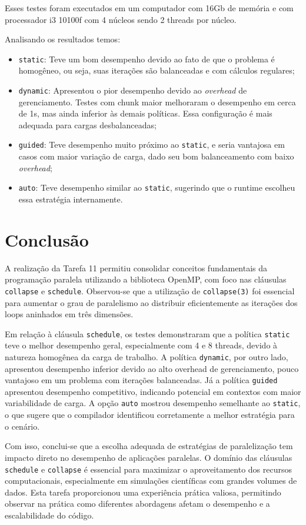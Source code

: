 \documentclass[a4paper, 12pt]{article}
\begin{document}
	Esses testes foram executados em um computador com 16Gb de memória e com processador i3 10100f com 4 núcleos sendo 2 threads por núcleo. 
	
	Analisando os resultados temos:
	
	\begin{itemize}  
		\item \texttt{static}: Teve um bom desempenho devido ao fato de que o problema é homogêneo, ou seja, suas iterações são balanceadas e com cálculos regulares;
		\item \texttt{dynamic}: Apresentou o pior desempenho devido ao \textit{overhead} de gerenciamento. Testes com chunk maior melhoraram o desempenho em cerca de 1s, mas ainda inferior às demais políticas. Essa configuração é mais adequada para cargas desbalanceadas;
		\item \texttt{guided}: Teve desempenho muito próximo ao \texttt{static}, e seria vantajosa em casos com maior variação de carga, dado seu bom balanceamento com baixo \textit{overhead};
		\item \texttt{auto}: Teve desempenho similar ao \texttt{static}, sugerindo que o runtime escolheu essa estratégia internamente.
	\end{itemize}  
	
	\section{Conclusão}  
	\hspace{.62cm}A realização da Tarefa 11 permitiu consolidar conceitos fundamentais da programação paralela utilizando a biblioteca OpenMP, com foco nas cláusulas \texttt{collapse} e \texttt{schedule}. Observou-se que a utilização de \texttt{collapse(3)} foi essencial para aumentar o grau de paralelismo ao distribuir eficientemente as iterações dos loops aninhados em três dimensões.  
	
	Em relação à cláusula \texttt{schedule}, os testes demonstraram que a política \texttt{static} teve o melhor desempenho geral, especialmente com 4 e 8 threads, devido à natureza homogênea da carga de trabalho. A política \texttt{dynamic}, por outro lado, apresentou desempenho inferior devido ao alto overhead de gerenciamento, pouco vantajoso em um problema com iterações balanceadas. Já a política \texttt{guided} apresentou desempenho competitivo, indicando potencial em contextos com maior variabilidade de carga. A opção \texttt{auto} mostrou desempenho semelhante ao \texttt{static}, o que sugere que o compilador identificou corretamente a melhor estratégia para o cenário.
	
	Com isso, conclui-se que a escolha adequada de estratégias de paralelização tem impacto direto no desempenho de aplicações paralelas. O domínio das cláusulas \texttt{schedule} e \texttt{collapse} é essencial para maximizar o aproveitamento dos recursos computacionais, especialmente em simulações científicas com grandes volumes de dados. Esta tarefa proporcionou uma experiência prática valiosa, permitindo observar na prática como diferentes abordagens afetam o desempenho e a escalabilidade do código.
\end{document}
